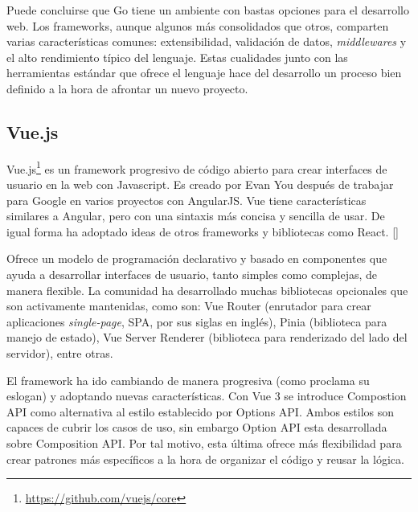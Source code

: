 Puede concluirse que Go tiene un ambiente con bastas opciones para el desarrollo web. Los frameworks, aunque algunos más consolidados que otros, comparten varias características comunes: extensibilidad, validación de datos, \textit{middlewares} y el alto rendimiento típico del lenguaje. Estas cualidades junto con las herramientas estándar que ofrece el lenguaje hace del desarrollo un proceso bien definido a la hora de afrontar un nuevo proyecto.

\subsection{Vue.js}

Vue.js\footnote{\url{https://github.com/vuejs/core}} es un framework progresivo de código abierto para crear interfaces de usuario en la web con Javascript. Es creado por Evan You después de trabajar para Google en varios proyectos con AngularJS. Vue tiene características similares a Angular, pero con una sintaxis más concisa y sencilla de usar. De igual forma ha adoptado ideas de otros frameworks y bibliotecas como React. [\cite{vue-docs}]

Ofrece un modelo de programación declarativo y basado en componentes que ayuda a desarrollar interfaces de usuario, tanto simples como complejas, de manera flexible. La comunidad ha desarrollado muchas bibliotecas opcionales que son activamente mantenidas, como son: Vue Router (enrutador para crear aplicaciones \textit{single-page}, SPA, por sus siglas en inglés), Pinia (biblioteca para manejo de estado), Vue Server Renderer (biblioteca para renderizado del lado del servidor), entre otras.

El framework ha ido cambiando de manera progresiva (como proclama su eslogan) y adoptando nuevas características. Con Vue 3 se introduce Compostion API como alternativa al estilo establecido por Options API. Ambos estilos son capaces de cubrir los casos de uso, sin embargo Option API esta desarrollada sobre Composition API. Por tal motivo, esta última ofrece más flexibilidad para crear patrones más específicos a la hora de organizar el código y reusar la lógica.

